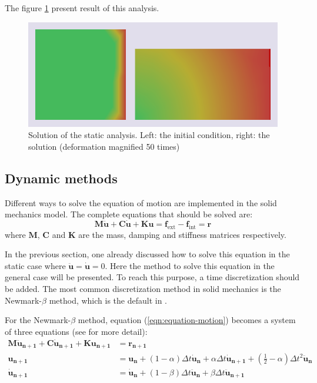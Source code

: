 \documentclass[a4paper,11pt]{book}
\newcommand{\akantu}{{\cminfamily{\textbf{Akantu}}}\xspace}
\renewcommand{\vec}[1]{\ensuremath{\boldsymbol{#1}}}
\newcommand{\mat}[1]{\ensuremath{\boldsymbol{#1}}}
\newcommand{\st}[1]{{\mathrm{#1}}}
\begin{document}
The figure \ref{fig:smm:implicit:static_solution} present result of this analysis.

\begin{figure}[!htb]
  \centering
  \includegraphics[width=.6\linewidth]{figures/static_analysis}
  \caption{Solution of the static  analysis. Left: the initial condition, right:
    the solution (deformation magnified 50 times)}
  \label{fig:smm:implicit:static_solution}
\end{figure}

\subsection{Dynamic methods} \label{sect:smm:Dynamic_methods}

Different ways  to solve  the equation  of motion are  implemented in  the solid
mechanics model.  The complete equations that should be solved are:
\begin{equation}\label{eqn:equation-motion}
  \mat{M}\vec{\ddot{u}}     +    \mat{C}\vec{\dot{u}}    +     \mat{K}\vec{u}    =
  \vec{f_{\st{ext}}} - \vec{f_{\st{int}}} = \vec{r}
\end{equation}
where $\mat{M}$,  $\mat{C}$ and  $\mat{K}$ are the  mass, damping  and stiffness
matrices respectively.

In the previous section, one already discussed how to solve this equation in the
static  case where $\vec{\ddot{u}}  = \vec{\dot{u}}  = 0$.   Here the  method to
solve  this equation  in the  general  case will  be presented.   To reach  this
purpose, a time discretization should  be added.  The most common discretization
method in solid mechanics is the Newmark-$\beta$ method, which is the default in
\akantu.

For the  Newmark-$\beta$ method, equation  (\ref{eqn:equation-motion}) becomes a
system  of three  equations  (see \cite{curnier92a}  \cite{hughes-83a} for  more
detail):
\begin{align}
  \mat{M}   \vec{\ddot{u}_{n+1}}  +   \mat{C}   \vec{\dot{u}_{n+1}}  +   \mat{K}
  \vec{u_{n+1}} &= \vec{r_{n+1}} \label{eqn:equation-motion-discret} \\
  \vec{u_{n+1}}   &=   \vec{u_{n}}   +   \left(1  -   \alpha\right)   \Delta   t
  \vec{\dot{u}_{n}} + \alpha \Delta  t \vec{\dot{u}_{n+1}} + \left(\frac{1}{2} -
    \alpha\right) \Delta t^2 \vec{\ddot{u}_n} \label{eqn:finite-difference-1}\\
  \vec{\dot{u}_{n+1}}  &= \vec{\dot{u}_{n}}  + \left(1  - \beta\right)  \Delta t
  \vec{\ddot{u}_{n}}            +            \beta           \Delta            t
  \vec{\ddot{u}_{n+1}} \label{eqn:finite-difference-2}
\end{align}
\end{document}
